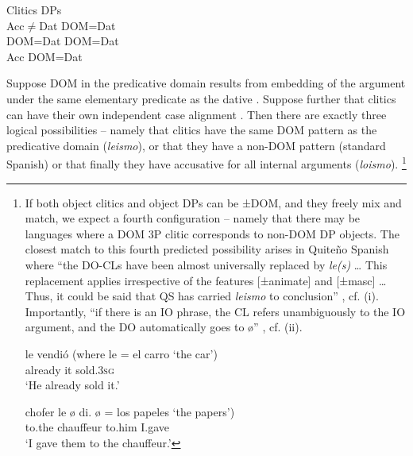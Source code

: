\documentclass[output=paper,colorlinks,citecolor=brown,nonflat]{./langscibook}
\begin{document}
\ea%
    \label{ex:manzini:30}
    Clitics DPs \\
    \ea\label{ex:manzini:30a} 
    Acc${\neq}$Dat      DOM=Dat\\
    \ex\label{ex:manzini:30b} 
        \ea\label{ex:manzini:30bi} 
        DOM=Dat    DOM=Dat\\
        \ex\label{ex:manzini:30bii} 
        Acc        DOM=Dat \\
        \z
    \z
\z


Suppose DOM in the predicative domain results from embedding of the argument under the same elementary predicate as the dative . Suppose further that clitics can have their own independent case alignment . Then there are exactly three logical possibilities – namely that clitics have the same DOM pattern as the predicative domain (\textit{leismo}), or that they have a non-DOM pattern (standard Spanish) or that finally they have accusative for all internal arguments (\textit{loismo}).{} \footnote{If both object clitics and object DPs can be ±DOM, and they freely mix and match, we expect a fourth configuration – namely that there may be languages where a DOM 3P clitic corresponds to non-DOM DP objects. The closest match to this fourth predicted possibility arises in Quiteño Spanish where “the DO-CLs have been almost universally replaced by \textit{le(s)} … This replacement applies irrespective of the features [±animate] and [±masc] …Thus, it could be said that QS has carried \textit{leismo} to conclusion” \citep[387-388]{Suñer1989}, cf. (i). Importantly, “if there is an IO phrase, the CL refers unambiguously to the IO argument, and the DO automatically goes to ø” \citep[389]{Suñer1989}, cf. (ii).  

\ea%
    
     {le}   {vendió}   \hfill (where {le} {=} {el} {carro} ‘the car’)\\
        already   it   sold\textsc{.3sg}\\
    \glt ‘He already sold it.’
\z

\ea%
    
     {chofer}  {le}   {ø} {di.}   {ø} = {los} {papeles} ‘the papers’)\\
        to.the chauffeur   to.him   {} I.gave\\
    \glt ‘I gave them to the chauffeur.’
\z
}
\end{document}
